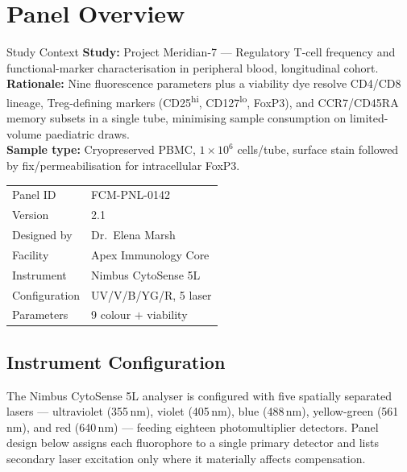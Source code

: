 \section{Panel Overview}
\label{sec:overview}

\begin{minipage}[t]{0.58\textwidth}
\begin{infobox}{Study Context}
\textbf{Study:} Project Meridian-7 --- Regulatory T-cell frequency and
functional-marker characterisation in peripheral blood, longitudinal cohort.\\[3pt]
\textbf{Rationale:} Nine fluorescence parameters plus a viability dye resolve
CD4/CD8 lineage, Treg-defining markers (CD25\textsuperscript{hi},
CD127\textsuperscript{lo}, FoxP3), and CCR7/CD45RA memory subsets in a single
tube, minimising sample consumption on limited-volume paediatric draws.\\[3pt]
\textbf{Sample type:} Cryopreserved PBMC, $1\times10^{6}$ cells/tube, surface
stain followed by fix/permeabilisation for intracellular FoxP3.
\end{infobox}
\end{minipage}%
\hfill
\begin{minipage}[t]{0.39\textwidth}
\begin{tcolorbox}[flowbox,colframe=FlowBorder,colback=FlowLight,
  colbacktitle=FlowTeal,coltitle=white,title={\faFlask\hspace{4pt}Run Metadata}]
\small
\begin{tabularx}{\linewidth}{@{}L{2.15cm}X@{}}
Panel ID & FCM-PNL-0142 \\
Version & 2.1 \\
Designed by & Dr.~Elena Marsh \\
Facility & Apex Immunology Core \\
Instrument & Nimbus CytoSense 5L \\
Configuration & UV/V/B/YG/R, 5 laser \\
Parameters & 9 colour \(+\) viability \\
\end{tabularx}
\end{tcolorbox}
\end{minipage}
\par
\vspace{6pt}

\subsection{Instrument Configuration}
The Nimbus CytoSense 5L analyser is configured with five spatially separated
lasers --- ultraviolet (355\,nm), violet (405\,nm), blue (488\,nm),
yellow-green (561\,nm), and red (640\,nm) --- feeding eighteen photomultiplier
detectors. Panel design below assigns each fluorophore to a single primary
detector and lists secondary laser excitation only where it materially
affects compensation.

